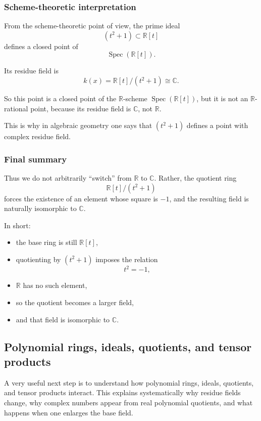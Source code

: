\documentclass[12pt,a4paper]{article}
\theoremstyle{notespace}
\newcommand{\Spec}{\operatorname{Spec}}
\theoremstyle{definition}
\begin{document}
\subsubsection{Scheme-theoretic interpretation}

From the scheme-theoretic point of view, the prime ideal
\[
(t^2+1)\subset \mathbb{R}[t]
\]
defines a closed point of
\[
\Spec(\mathbb{R}[t]).
\]

Its residue field is
\[
k(x)=\mathbb{R}[t]/(t^2+1)\cong \mathbb{C}.
\]

So this point is a closed point of the \(\mathbb{R}\)-scheme \(\Spec(\mathbb{R}[t])\), but it is not an \(\mathbb{R}\)-rational point, because its residue field is \(\mathbb{C}\), not \(\mathbb{R}\).

This is why in algebraic geometry one says that \((t^2+1)\) defines a point with complex residue field.

\subsubsection{Final summary}

Thus we do not arbitrarily ``switch'' from \(\mathbb{R}\) to \(\mathbb{C}\).  
Rather, the quotient ring
\[
\mathbb{R}[t]/(t^2+1)
\]
forces the existence of an element whose square is \(-1\), and the resulting field is naturally isomorphic to \(\mathbb{C}\).

In short:

\begin{itemize}
	\item the base ring is still \(\mathbb{R}[t]\),
	\item quotienting by \((t^2+1)\) imposes the relation
	\[
	t^2=-1,
	\]
	\item \(\mathbb{R}\) has no such element,
	\item so the quotient becomes a larger field,
	\item and that field is isomorphic to \(\mathbb{C}\).
\end{itemize}

\subsection{Polynomial rings, ideals, quotients, and tensor products}

A very useful next step is to understand how polynomial rings, ideals, quotients, and tensor products interact.  
This explains systematically why residue fields change, why complex numbers appear from real polynomial quotients, and what happens when one enlarges the base field.
\end{document}
